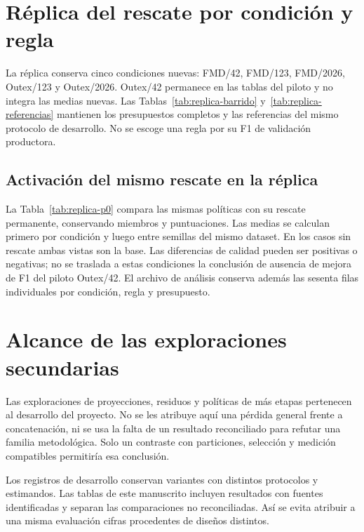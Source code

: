 \section{Réplica del rescate por condición y regla}\label{sec:anexo-replica}
La réplica conserva cinco condiciones nuevas: FMD/42, FMD/123, FMD/2026, Outex/123 y Outex/2026. Outex/42 permanece en las tablas del piloto y no integra las medias nuevas. Las Tablas~\ref{tab:replica-barrido} y~\ref{tab:replica-referencias} mantienen los presupuestos completos y las referencias del mismo protocolo de desarrollo. No se escoge una regla por su F1 de validación productora.



\FloatBarrier

\subsection{Activación del mismo rescate en la réplica}
La Tabla~\ref{tab:replica-p0} compara las mismas políticas con su rescate permanente, conservando miembros y puntuaciones. Las medias se calculan primero por condición y luego entre semillas del mismo dataset. En los casos sin rescate ambas vistas son la base. Las diferencias de calidad pueden ser positivas o negativas; no se traslada a estas condiciones la conclusión de ausencia de mejora de F1 del piloto Outex/42. El archivo de análisis conserva además las sesenta filas individuales por condición, regla y presupuesto.


\FloatBarrier

\section{Alcance de las exploraciones secundarias}
Las exploraciones de proyecciones, residuos y políticas de más etapas pertenecen al desarrollo del proyecto. No se les atribuye aquí una pérdida general frente a concatenación, ni se usa la falta de un resultado reconciliado para refutar una familia metodológica. Solo un contraste con particiones, selección y medición compatibles permitiría esa conclusión.

Los registros de desarrollo conservan variantes con distintos protocolos y estimandos. Las tablas de este manuscrito incluyen resultados con fuentes identificadas y separan las comparaciones no reconciliadas. Así se evita atribuir a una misma evaluación cifras procedentes de diseños distintos.
